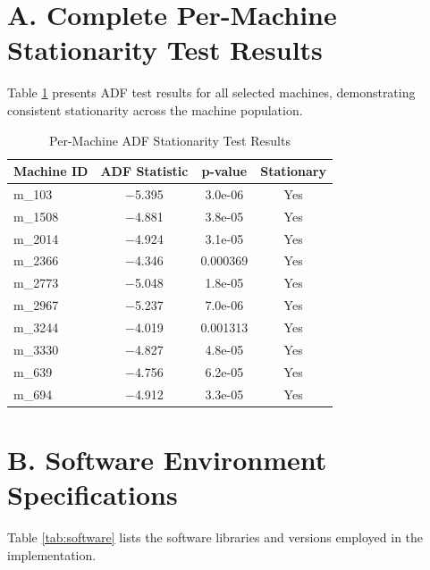 \documentclass[12pt]{report}
\begin{document}
\section*{A. Complete Per-Machine Stationarity Test Results}

Table \ref{tab:per_machine_adf} presents ADF test results for all selected machines, demonstrating consistent stationarity across the machine population.

\begin{table}[H]
\centering
\caption{Per-Machine ADF Stationarity Test Results}
\label{tab:per_machine_adf}
\begin{tabular}{lccc}
\toprule
\textbf{Machine ID} & \textbf{ADF Statistic} & \textbf{p-value} & \textbf{Stationary} \\
\midrule
m\_103 & $-$5.395 & 3.0e-06 & Yes \\
m\_1508 & $-$4.881 & 3.8e-05 & Yes \\
m\_2014 & $-$4.924 & 3.1e-05 & Yes \\
m\_2366 & $-$4.346 & 0.000369 & Yes \\
m\_2773 & $-$5.048 & 1.8e-05 & Yes \\
m\_2967 & $-$5.237 & 7.0e-06 & Yes \\
m\_3244 & $-$4.019 & 0.001313 & Yes \\
m\_3330 & $-$4.827 & 4.8e-05 & Yes \\
m\_639 & $-$4.756 & 6.2e-05 & Yes \\
m\_694 & $-$4.912 & 3.3e-05 & Yes \\
\bottomrule
\end{tabular}
\end{table}

\section*{B. Software Environment Specifications}

Table \ref{tab:software} lists the software libraries and versions employed in the implementation.
\end{document}
